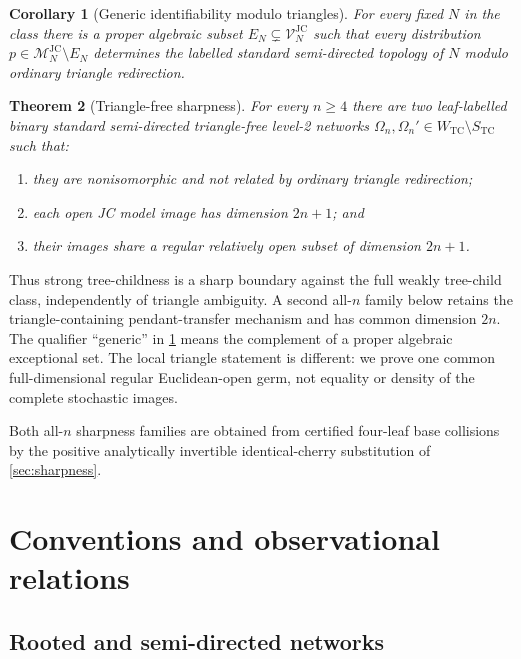 \documentclass[11pt]{article}
\newtheorem{theorem}{Theorem}[section]
\newtheorem{corollary}[theorem]{Corollary}
\theoremstyle{remark}
\newcommand{\M}{\mathcal M}
\newcommand{\V}{\mathcal V}
\newcommand{\TCw}{W_{\mathrm{TC}}}
\newcommand{\TCs}{S_{\mathrm{TC}}}
\newcommand{\JC}{\mathrm{JC}}
\begin{document}
\begin{corollary}[Generic identifiability modulo triangles]\label{cor:generic}
For every fixed $N$ in the class there is a proper algebraic subset
$E_N\subsetneq\V_N^{\JC}$ such that every distribution
$p\in\M_N^{\JC}\setminus E_N$ determines the labelled standard
semi-directed topology of $N$ modulo ordinary triangle redirection.
\end{corollary}

\begin{theorem}[Triangle-free sharpness]\label{thm:sharpness}
For every $n\ge4$ there are two leaf-labelled binary standard
semi-directed \emph{triangle-free} level-2 networks
$\Omega_n,\Omega_n'\in\TCw\setminus\TCs$ such that:
\begin{enumerate}[label=(\roman*)]
  \item they are nonisomorphic and not related by ordinary triangle
        redirection;
  \item each open JC model image has dimension $2n+1$; and
  \item their images share a regular relatively open subset of dimension
        $2n+1$.
\end{enumerate}
\end{theorem}

Thus strong tree-childness is a sharp boundary against the full weakly
tree-child class, independently of triangle ambiguity.  A second all-$n$
family below retains the triangle-containing pendant-transfer mechanism and
has common dimension $2n$.  The qualifier ``generic'' in
\cref{cor:generic} means the
complement of a proper algebraic exceptional set.  The local triangle
statement is different: we prove one common full-dimensional regular
Euclidean-open germ, not equality or density of the complete stochastic
images.

Both all-$n$ sharpness families are obtained from certified four-leaf base
collisions by the positive analytically invertible identical-cherry
substitution of \cref{sec:sharpness}.

\section{Conventions and observational relations}\label{sec:definitions}

\subsection{Rooted and semi-directed networks}
\end{document}

